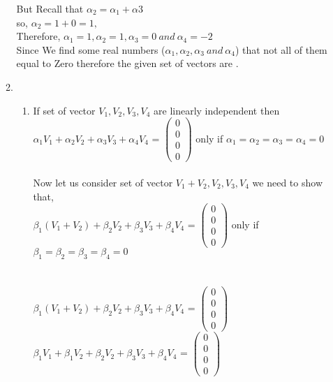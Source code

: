 \documentclass[45pt]{article}
\begin{document}
\begin{enumerate}
\begin{enumerate}
But Recall that $\alpha_2=\alpha_1+\alpha3$\\
so, $\alpha_2= 1+0 = 1,$ \\
Therefore, $\alpha_1=1, \alpha_2=1, \alpha_3=0~ and ~\alpha_4=-2$\\
Since We find some real numbers ($\alpha_1, \alpha_2, \alpha_3~and ~\alpha_4$) that not all of them equal to Zero therefore the given set of vectors are .\\
    
\item \begin{enumerate}
    \item If set of vector {$V_1,V_2,V_3,V_4$} are linearly independent then \\
 $\alpha_1 V_1+\alpha_2 V_2+\alpha_3 V_3+ \alpha_4 V_4$ =
$\begin{pmatrix}
0\\0\\0\\0
\end{pmatrix}
$ only if $\alpha_1 = \alpha_2 =\alpha_3= \alpha_4=0$\\\\
Now let us consider set of vector ${V_1+V_2,V_2,V_3,V_4}$
we need to show that,\\

$\beta_1 (V_1+V_2)+\beta_2 V_2+\beta_3 V_3+ \beta_4 V_4$ =
$\begin{pmatrix}
0\\0\\0\\0
\end{pmatrix}
$ 
 only if $\beta_1 = \beta_2 =\beta_3= \beta_4=0$\\\\
 
\\
$\beta_1 (V_1+V_2)+\beta_2 V_2+\beta_3 V_3+ \beta_4 V_4$ =
$\begin{pmatrix}
0\\0\\0\\0
\end{pmatrix}
$ \\

$\beta_1 V_1+ \beta_1 V_2+\beta_2 V_2+\beta_3 V_3+ \beta_4 V_4$ =
$\begin{pmatrix}
0\\0\\0\\0
\end{pmatrix}
$ 


\end{enumerate}
\end{enumerate}
\end{enumerate}
\end{document}
